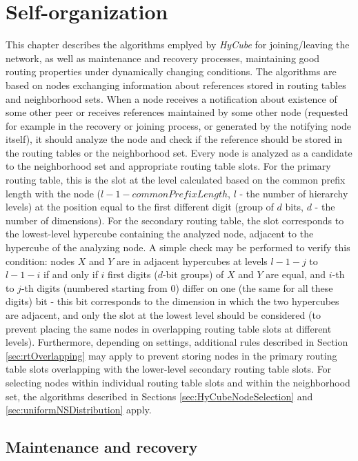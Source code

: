 
\chapter{Self-organization}
\label{sec:selfOrganization}

This chapter describes the algorithms emplyed by \emph{HyCube} for joining/leaving the network, as well as maintenance and recovery processes, maintaining good routing properties under dynamically changing conditions. The algorithms are based on nodes exchanging information about references stored in routing tables and neighborhood sets. When a node receives a notification about existence of some other peer or receives references maintained by some other node (requested for example in the recovery or joining process, or generated by the notifying node itself), it should analyze the node and check if the reference should be stored in the routing tables or the neighborhood set. Every node is analyzed as a candidate to the neighborhood set and appropriate routing table slots. 
For the primary routing table, this is the slot at the level calculated based on the common prefix length with the node ($l - 1 - commonPrefixLength$, $l$ - the number of hierarchy levels) at the position equal to the first different digit (group of $d$ bits, $d$ - the number of dimensions).
For the secondary routing table, the slot corresponds to the lowest-level hypercube containing the analyzed node, adjacent to the hypercube of the analyzing node. A simple check may be performed to verify this condition: nodes $X$ and $Y$ are in adjacent hypercubes at levels $l - 1 - j$ to $l - 1 - i$ if and only if $i$ first digits ($d$-bit groups) of $X$ and $Y$ are equal, and $i$-th to $j$-th digits (numbered starting from 0) differ on one (the same for all these digits) bit - this bit corresponds to the dimension in which the two hypercubes are adjacent, and only the slot at the lowest level should be considered (to prevent placing the same nodes in overlapping routing table slots at different levels). Furthermore, depending on settings, additional rules described in Section \ref{sec:rtOverlapping} may apply to prevent storing nodes in the primary routing table slots overlapping with the lower-level secondary routing table slots.
For selecting nodes within individual routing table slots and within the neighborhood set, the algorithms described in Sections \ref{sec:HyCubeNodeSelection} and \ref{sec:uniformNSDistribution} apply.




\section{Maintenance and recovery}

